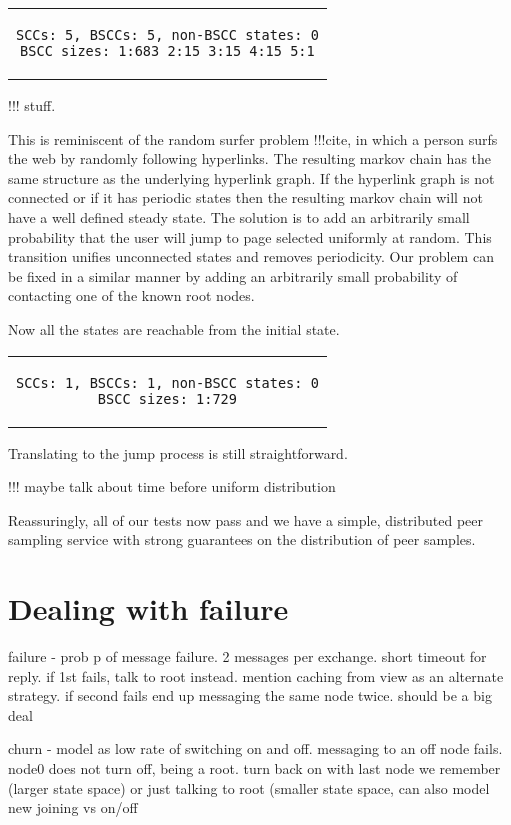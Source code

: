 \documentclass[a4paper,10pt]{article}
\newcommand{\prismmodel}[1]{
  \begin{quotation}
  \footnotesize
  
  \end{quotation}
}
\newenvironment{prismprop}[0]{
  \begin{center}
  \begin{tabular}{c}
  \footnotesize
}{
  \end{tabular}
  \end{center}
}
\begin{document}
\begin{prismprop}
\begin{lstlisting}
SCCs: 5, BSCCs: 5, non-BSCC states: 0
BSCC sizes: 1:683 2:15 3:15 4:15 5:1
\end{lstlisting}
\end{prismprop}

!!! stuff. 

This is reminiscent of the random surfer problem !!!cite, in which a person surfs the web by randomly following hyperlinks. The resulting markov chain has the same structure as the underlying hyperlink graph. If the hyperlink graph is not connected or if it has periodic states then the resulting markov chain will not have a well defined steady state. The solution is to add an arbitrarily small probability that the user will jump to page selected uniformly at random. This transition unifies unconnected states and removes periodicity. Our problem can be fixed in a similar manner by adding an arbitrarily small probability of contacting one of the known root nodes.

\prismmodel{ctmc_full}

Now all the states are reachable from the initial state.

\begin{prismprop}
\begin{lstlisting}
SCCs: 1, BSCCs: 1, non-BSCC states: 0
BSCC sizes: 1:729
\end{lstlisting}
\end{prismprop}

Translating to the jump process is still straightforward.

\prismmodel{dtmc_full}

!!! maybe talk about time before uniform distribution

Reassuringly, all of our tests now pass and we have a simple, distributed peer sampling service with strong guarantees on the distribution of peer samples. 

\section{Dealing with failure}

failure - prob p of message failure. 2 messages per exchange. short timeout for reply. if 1st fails, talk to root instead. mention caching from view as an alternate strategy. if second fails end up messaging the same node twice. should be a big deal

churn - model as low rate of switching on and off. messaging to an off node fails. node0 does not turn off, being a root. turn back on with last node we remember (larger state space) or just talking to root (smaller state space, can also model new joining vs on/off 
\end{document}
